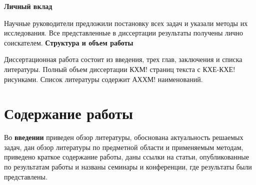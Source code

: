 \textbf{Личный вклад}

Научные руководители предложили постановку всех задач и указали методы их исследования. Все представленные в диссертации результаты получены лично соискателем. 
\textbf{Структура и объем работы}

Диссертационная работа состоит из введения, трех глав, заключения и списка литературы. Полный объем диссертации КХМ! страниц текста с КХЕ-КХЕ! рисунками. Список литературы содержит АХХМ! наименований.

\section*{Содержание работы}

Во \textbf{введении} приведен обзор литературы, обоснована актуальность решаемых задач, дан обзор литературы по предметной области и применяемым методам, приведено краткое содержание работы, даны ссылки на статьи, опубликованные по результатам работы и названы семинары и конференции, где результаты были представлены.

